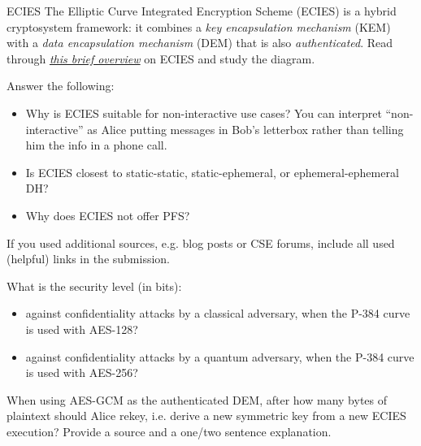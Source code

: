 \documentclass{homework}
\begin{document}
\begin{task}{ECIES}
  The Elliptic Curve Integrated Encryption Scheme (ECIES) is a hybrid cryptosystem framework: it combines a \emph{key encapsulation mechanism} (KEM) with a \emph{data encapsulation mechanism} (DEM) that is also \emph{authenticated}.
  Read through \href{https://cryptobook.nakov.com/asymmetric-key-ciphers/ecies-public-key-encryption}{\textit{this brief overview}} on ECIES and study the diagram.

  Answer the following:
  \begin{itemize}
    \item Why is ECIES suitable for non-interactive use cases?
    You can interpret \enquote{non-interactive} as Alice putting messages in Bob's letterbox rather than telling him the info in a phone call.
    \item Is ECIES closest to static-static, static-ephemeral, or ephemeral-ephemeral DH?
    \item Why does ECIES not offer PFS?
  \end{itemize}

  If you used additional sources, e.g. blog posts or CSE forums, include all used (helpful) links in the submission.

  What is the security level (in bits):
  \begin{itemize}
    \item against confidentiality attacks by a classical adversary, when the P-384 curve is used with AES-128?
    \item against confidentiality attacks by a quantum adversary, when the P-384 curve is used with AES-256?
  \end{itemize}

  When using AES-GCM as the authenticated DEM, after how many bytes of plaintext should Alice rekey, i.e. derive a new symmetric key from a new ECIES execution?
  Provide a source and a one/two sentence explanation.

  \iffalse
  As a rough overview, the following can be parametrised:
  \begin{itemize}
    \item the key derivation function (KDF), e.g. KDF2;
    \item the scheme for authenticating the encryption, e.g. HMAC-SHA-512;
    \item the symmetric encryption scheme, e.g. AES-256-CBC;
  \end{itemize}
  on top of different elliptic curve domain parameters.
  Some implementations even allow to change the key-agreement protocol (variations of DH).
  Combinations are also possible.
  For example, when using XChaCha20-Poly1305, a separate message-authentication scheme is no longer needed.
  \fi


\end{task}
\end{document}
